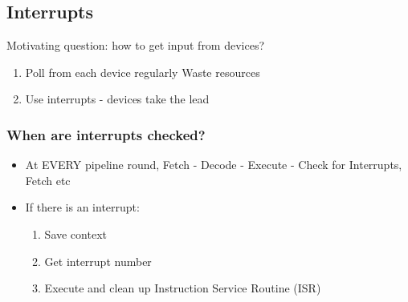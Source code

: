 \documentclass[11pt]{article}
\begin{document}
\subsection{Interrupts}
\label{sec:org5d50020}
Motivating question: how to get input from devices?
\begin{enumerate}
\item Poll from each device regularly
Waste resources
\item Use interrupts - devices take the lead
\end{enumerate}
\subsubsection{When are interrupts checked?}
\label{sec:org45089c0}
\begin{itemize}
\item At EVERY pipeline round, Fetch - Decode - Execute - Check for Interrupts,
Fetch etc
\item If there is an interrupt:
\begin{enumerate}
\item Save context
\item Get interrupt number
\item Execute and clean up Instruction Service Routine (ISR)
\end{enumerate}
\end{itemize}
\end{document}
